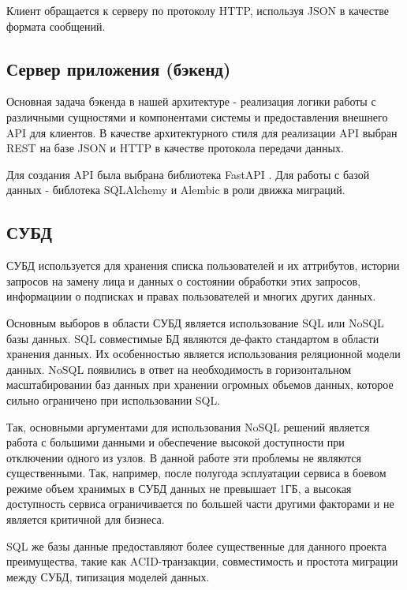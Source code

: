 Клиент обращается к серверу по протоколу HTTP, используя JSON в качестве формата сообщений.

\subsection{Сервер приложения (бэкенд)}

Основная задача бэкенда в нашей архитектуре - реализация логики работы с различными сущностями и компонентами системы и предоставления внешнего API для клиентов. В качестве архитектурного стиля для реализации API выбран REST\cite{masse2011rest} на базе JSON и HTTP в качестве протокола передачи данных.

Для создания API была выбрана библиотека FastAPI \cite{fastapi_website}. Для работы с базой данных - библотека SQLAlchemy и Alembic в роли движка миграций.

\subsection{СУБД}

СУБД используется для хранения списка пользователей и их аттрибутов, истории запросов на замену лица и данных о состоянии обработки этих запросов, информациии о подписках и правах пользователей и многих других данных.

Основным выборов в области СУБД является использование SQL или NoSQL базы данных. SQL совместимые БД являются де-факто стандартом в области хранения данных. Их особенностью является использования реляционной модели данных\cite{aguidetodb2}. NoSQL появились в ответ на необходимость в горизонтальном масштабировании баз данных при хранении огромных обьемов данных, которое сильно ограничено при использовании SQL. \cite{strauch2011nosql}

Так, основными аргументами для использования NoSQL решений является работа с большими данными и обеспечение высокой доступности при отключении одного из узлов. В данной работе эти проблемы не являются существенными. Так, например, после полугода эсплуатации сервиса в боевом режиме объем хранимых в СУБД данных не превышает 1ГБ, а высокая доступность сервиса ограничивается по большей части другими факторами и не является критичной для бизнеса.

SQL же базы данные предоставляют более существенные для данного проекта преимущества, такие как ACID-транзакции\cite{haerder1983principles}, совместимость и простота миграции между СУБД, типизация моделей данных\cite{ibmsqlvsnosql}.

